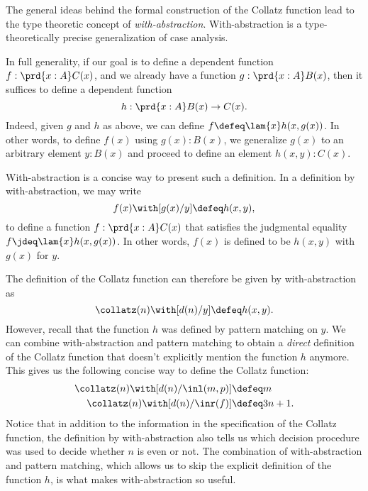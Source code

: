 \begin{rmk}
  The general ideas behind the formal construction of the Collatz function lead to the type theoretic concept of \emph{with-abstraction}. With-abstraction is a type-theoretically precise generalization of case analysis.
  
  In full generality, if our goal is to define a dependent function $f:\prd{x:A}C(x)$, and we already have a function $g:\prd{x:A}B(x)$, then it suffices to define a dependent function
  \begin{equation*}
    h:\prd{x:A}B(x)\to C(x).
  \end{equation*}
  Indeed, given $g$ and $h$ as above, we can define $f\defeq \lam{x}h(x,g(x))$. In other words, to define $f(x)$ using $g(x):B(x)$, we generalize $g(x)$ to an arbitrary element $y:B(x)$ and proceed to define an element $h(x,y):C(x)$.

  With-abstraction is a concise way to present such a definition. In a definition by with-abstraction, we may write
  \begin{equation*}
    f(x)\with [g(x)/y]\defeq h(x,y),
  \end{equation*}
  to define a function $f:\prd{x:A}C(x)$ that satisfies the judgmental equality $f\jdeq \lam{x}h(x,g(x))$. In other words, $f(x)$ is defined to be $h(x,y)$ with $g(x)$ for $y$.
  
  The definition of the Collatz function can therefore be given by with-abstraction as
  \begin{equation*}
    \collatz(n)\with [d(n)/y]\defeq h(x,y).
  \end{equation*}
  However, recall that the function $h$ was defined by pattern matching on $y$. We can combine with-abstraction and pattern matching to obtain a \emph{direct} definition of the Collatz function that doesn't explicitly mention the function $h$ anymore. This gives us the following concise way to define the Collatz function:
  \begin{align*}
    \collatz(n)\with [d(n)/\inl(m,p)] & \defeq m \\
    \collatz(n)\with [d(n)/\inr(f)] & \defeq 3n+1.
  \end{align*}
  Notice that in addition to the information in the specification of the Collatz function, the definition by with-abstraction also tells us which decision procedure was used to decide whether $n$ is even or not. The combination of with-abstraction and pattern matching, which allows us to skip the explicit definition of the function $h$, is what makes with-abstraction so useful.
  \end{rmk}
  
